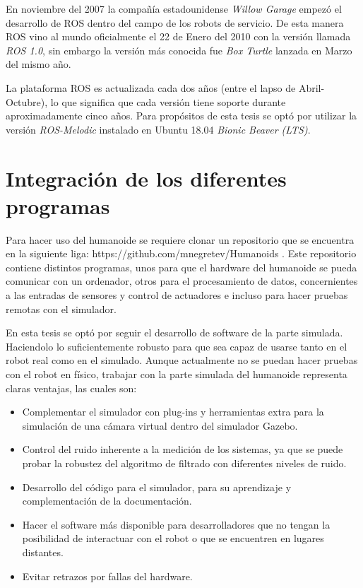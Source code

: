 En noviembre del 2007 la compañía estadounidense \textit{Willow Garage} empezó el desarrollo de ROS dentro del campo de los robots de servicio. De esta manera ROS vino al mundo oficialmente el 22 de Enero del 2010 con la versión llamada \textit{ROS 1.0}, sin embargo la versión más conocida fue \textit{Box Turtle} lanzada en Marzo del mismo año.

La plataforma ROS es actualizada cada dos años (entre el lapso de Abril-Octubre), lo que significa que cada versión tiene soporte durante aproximadamente cinco años. Para propósitos de esta tesis se optó por utilizar la versión \textit{ROS-Melodic} instalado en Ubuntu 18.04 \textit{Bionic Beaver (LTS)}.

	\section{Integración de los diferentes programas}
	Para hacer uso del humanoide se requiere clonar un repositorio que se encuentra en la siguiente liga: https://github.com/mnegretev/Humanoids . Este repositorio contiene distintos programas, unos para que el hardware del humanoide se pueda comunicar con un ordenador, otros para el procesamiento de datos, concernientes a las entradas de sensores y control de actuadores e incluso para hacer pruebas remotas con el simulador.
	
	En esta tesis se optó por seguir el desarrollo de software de la parte simulada. Haciendolo lo suficientemente robusto para que sea capaz de usarse tanto en el robot real como en el simulado. Aunque actualmente no se puedan hacer pruebas con el robot en físico, trabajar con la parte simulada del humanoide representa claras ventajas, las cuales son: 
	 
	\begin{itemize}
	 	\item Complementar el simulador con plug-ins y herramientas extra para la simulación de una cámara virtual dentro del simulador Gazebo.
	 	\item Control del ruido inherente a la medición de los sistemas, ya que se puede probar la robustez del algoritmo de filtrado con diferentes niveles de ruido.
	 	\item Desarrollo del código para el simulador, para su aprendizaje y complementación de la documentación.
	 	\item Hacer el software más disponible para desarrolladores que no tengan la posibilidad de interactuar con el robot o que se encuentren en lugares distantes.
	 	\item Evitar retrazos por fallas del hardware.
	\end{itemize}
	
